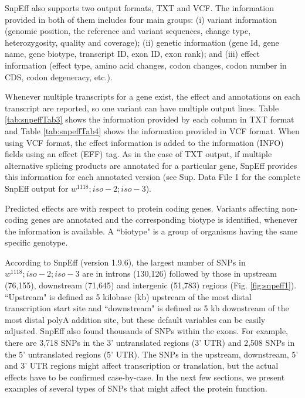 SnpEff also supports two output formats, TXT and VCF. The information provided in both of them includes four main groups: (i) variant information (genomic position, the reference and variant sequences, change type, heterozygosity, quality and coverage); (ii) genetic information (gene Id, gene name, gene biotype, transcript ID, exon ID, exon rank); and (iii) effect information (effect type, amino acid changes, codon changes, codon number in CDS, codon degeneracy, etc.).

Whenever multiple transcripts for a gene exist, the effect and annotations on each transcript are reported, so one variant can have multiple output lines. Table \ref{tab:snpeffTab3} shows the information provided by each column in TXT format and Table \ref{tab:snpeffTab4} shows the information provided in VCF format. When using VCF format, the effect information is added to the information (INFO) fields using an effect (EFF) tag. As in the case of TXT output, if multiple alternative splicing products are annotated for a particular gene, SnpEff provides this information for each annotated version (see Sup. Data File 1 for the complete SnpEff output for $w^{1118} ; iso-2; iso-3$).

Predicted effects are with respect to protein coding genes.  Variants affecting non-coding genes are annotated and the corresponding biotype is identified, whenever the information is available. A ``biotype" is a group of organisms having the same specific genotype.

According to SnpEff (version 1.9.6), the largest number of SNPs in $w^{1118} ; iso-2; iso-3$ are in introns (130,126) followed by those in upstream (76,155), downstream (71,645) and intergenic (51,783) regions (Fig. \ref{fig:snpeff1}). ``Upstream" is defined as 5 kilobase (kb) upstream of the most distal transcription start site and ``downstream" is defined as 5 kb downstream of the most distal polyA addition site, but these default variables can be easily adjusted.  SnpEff also found thousands of SNPs within the exons. For example, there are 3,718 SNPs in the 3' untranslated regions (3' UTR) and 2,508 SNPs in the 5' untranslated regions (5' UTR).  The SNPs in the upstream, downstream, 5' and 3' UTR regions might affect transcription or translation, but the actual effects have to be confirmed case-by-case. In the next few sections, we present examples of several types of SNPs that might affect the protein function.



